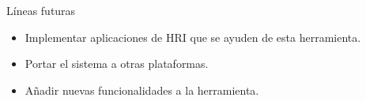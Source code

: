 \documentclass{beamer}
\begin{document}
\begin{frame}
\begin{block}{Líneas futuras}
\begin{itemize}
\item Implementar aplicaciones de HRI que se ayuden de esta herramienta.
\item Portar el sistema a otras plataformas.
\item Añadir nuevas funcionalidades a la herramienta.
\end{itemize}
\end{block}
\vspace{0.5cm}
\begin{figure}
  \begin{center}
  \end{center}
\end{figure}
\end{frame}

\begin{frame}[plain]
\large{\titlepage}
\end{frame}
\end{document}
